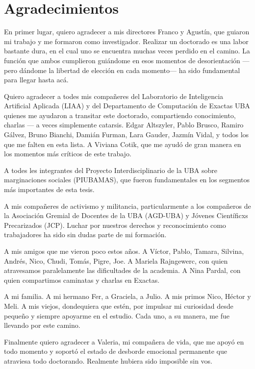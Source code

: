 \chapter*{Agradecimientos}


En primer lugar, quiero agradecer a mis directores Franco y Agustín, que guiaron mi trabajo y me formaron como investigador. Realizar un doctorado es una labor bastante dura, en el cual uno se encuentra muchas veces perdido en el camino. La función que ambos cumplieron guiándome en esos momentos de desorientación ---pero dándome la libertad de elección en cada momento--- ha sido fundamental para llegar hasta acá.

Quiero agradecer a todes mis compañeres del Laboratorio de Inteligencia Artificial Aplicada (LIAA) y del Departamento de Computación de Exactas UBA quienes me ayudaron a transitar este doctorado, compartiendo conocimiento, charlas --- a veces simplemente catarsis. Edgar Altszyler, Pablo Brusco, Ramiro Gálvez, Bruno Bianchi, Damián Furman, Lara Gauder, Jazmín Vidal, y todos los que me falten en esta lista. A Viviana Cotik, que me ayudó de gran manera en los momentos más críticos de este trabajo.

A todes les integrantes del Proyecto Interdisciplinario de la UBA sobre marginaciones sociales (PIUBAMAS), que fueron fundamentales en los segmentos más importantes de esta tesis.

A mis compañeres de activismo y militancia, particularmente a los compañeros de la Asociación Gremial de Docentes de la UBA (AGD-UBA) y Jóvenes Científicxs Precarizados (JCP). Luchar por nuestros derechos y reconocimiento como trabajadores ha sido sin dudas parte de mi formación.

A mis amigos que me vieron poco estos años. A Víctor, Pablo, Tamara, Silvina, Andrés, Nico, Chudi, Tomás, Pigre, Joe. A Mariela Rajngewerc, con quien atravesamos paralelamente las dificultades de la academia. A Nina Pardal, con quien compartimos caminatas y charlas en Exactas.

A mi familia. A mi hermano Fer, a Graciela, a Julio. A mis primos Nico, Héctor y Meli. A mis viejos, dondequiera que estén, por impulsar mi curiosidad desde pequeño y siempre apoyarme en el estudio. Cada uno, a su manera, me fue llevando por este camino.

Finalmente quiero agradecer a Valeria, mi compañera de vida, que me apoyó en todo momento y soportó el estado de desborde emocional permanente que atraviesa todo doctorando. Realmente hubiera sido imposible sin vos.


